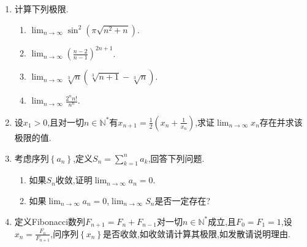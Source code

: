 \documentclass[b5paper,oneside]{ctexart}
\begin{document}
\begin{enumerate}[1.]
    \newpage
        \item 计算下列极限.
        \begin{enumerate}[(1)]
            \item $\lim_{n \to \infty} \sin^2{(\pi\sqrt{n^2+n})}$.
            \item $\lim_{n \to \infty} (\frac{n-2}{n-1})^{2n+1}$.
            \item $\lim_{n \to \infty} \sqrt[3]{n}(\sqrt[3]{n+1}-\sqrt[3]{n})$.
            \item $\lim_{n \to \infty} \frac{2^nn!}{n^n}$.
        \end{enumerate}
    \newpage
    \item 设$x_1>0$,且对一切$n \in \mathbb{N}^*$有$x_{n+1}=\frac{1}{2}(x_n+\frac{1}{x_n})$,求证$\lim_{n \to \infty} x_n$存在并求该极限的值.
    \newpage
    \item 考虑序列$\left\{ a_n \right\}$,定义$S_n=\sum_{k=1}^{n}a_k$,回答下列问题.
        \begin{enumerate}[(1)]
            \item 如果$S_n$收敛,证明$\lim_{n \to \infty} a_n=0$.
            \item 如果$\lim_{n \to \infty} a_n=0$,$\lim_{n \to \infty} S_n$是否一定存在?
        \end{enumerate}
    \newpage
    \item 定义Fibonacci数列$F_{n+1}=F_n+F_{n-1}$对一切$n \in \mathbb{N}^*$成立,且$F_0=F_1=1$,设$x_n=\frac{F_n}{F_{n+1}}$,问序列$\left\{ x_n \right\}$是否收敛,如收敛请计算其极限,如发散请说明理由.
\end{enumerate}
\end{document}
